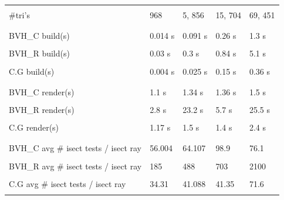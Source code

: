 \documentclass[11pt,a4paper]{article}
\begin{document}
\begin{table}[ht] 
\centering 
{\footnotesize
\begin{tabular}{ P{2.5cm}||P{2.5cm}P{2.5cm} P{2.5cm} P{2.5cm}  }      %
\hline
\\
\#tri's & 968  & 5, 856 & 15, 704 & 69, 451 \\ [0.5ex] %
\\
\hline \hline
\\
BVH\_C build(s)& 0.014 s& 0.091 s & 0.26 s & 1.3 s \\
\\
BVH\_R build(s)& 0.03 s& 0.3 s & 0.84 s & 5.1 s \\
\\
C.G build(s)& 0.004 s& 0.025 s & 0.15 s & 0.36 s \\
\\
\hline \hline
\\
BVH\_C render(s)& 1.1 s& 1.34 s & 1.36 s & 1.5 s \\
\\
BVH\_R render(s)& 2.8 s& 23.2 s & 5.7 s & 25.5 s \\
\\
C.G render(s)& 1.17 s& 1.5 s & 1.4 s & 2.4 s \\
\\
\hline \hline
\\
BVH\_C avg \# isect tests / isect ray& 56.004& 64.107& 98.9& 76.1 \\
\\
BVH\_R avg \# isect tests / isect ray& 185& 488& 703& 2100 \\
\\
C.G avg \# isect tests / isect ray& 34.31& 41.088& 41.35& 71.6 \\
\\
\hline \hline
    \end{tabular}
}
\end{table}

\pagebreak
\end{document}
